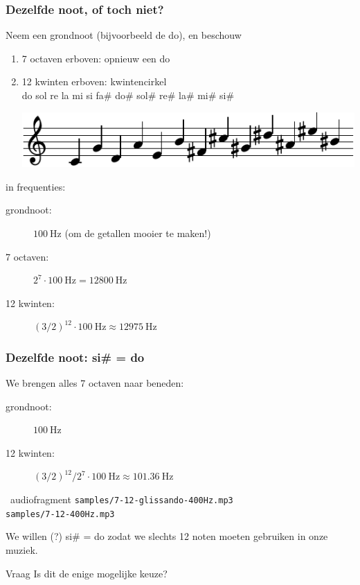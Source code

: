 \documentclass[compress, darktitle, framenumber, handout, totalframenumber]{beamer}
\begin{document}
\begin{frame}
  \frametitle{Dezelfde noot, of toch niet?}

  Neem een grondnoot (bijvoorbeeld de do), en beschouw
  \begin{enumerate}
    \item 7 octaven erboven: opnieuw een do
      \pause
    \item 12 kwinten erboven: \alert{kwintencirkel} \\
      do sol re la mi si fa\# do\# sol\# re\# la\# mi\# si\#

      \includegraphics{scores/circle-cropped}
  \end{enumerate}
  \pause
  in frequenties:
  \begin{description}
    \item[grondnoot:] $\SI{100}{\hertz}$ (om de getallen mooier te maken!)
    \item[7 octaven:] $2^7\cdot\SI{100}{\hertz}=\SI{12800}{\hertz}$ 
      \pause
    \item[12 kwinten:] $(3/2)^{12}\cdot\SI{100}{\hertz}\approx\SI{12975}{\hertz}$
  \end{description}
\end{frame}

\begin{frame}
  \frametitle{Dezelfde noot: si\# = do}

  We brengen alles 7 octaven naar beneden:
  \begin{description}
    \item[grondnoot:] $\SI{100}{\hertz}$
    \item[12 kwinten:] $(3/2)^{12}/2^7\cdot\SI{100}{\hertz}\approx\SI{101.36}{\hertz}$
  \end{description}
  \pause
  \begin{block}{\twonotes\ audiofragment}
    \texttt{samples/7-12-glissando-400Hz.mp3} \\
    \texttt{samples/7-12-400Hz.mp3}
  \end{block}
  \pause
  We willen (?) si\# = do zodat we slechts 12 noten moeten gebruiken in onze muziek.

  \begin{alertblock}{Vraag}
    Is dit de enige mogelijke keuze?
  \end{alertblock}
\end{frame}
\end{document}
